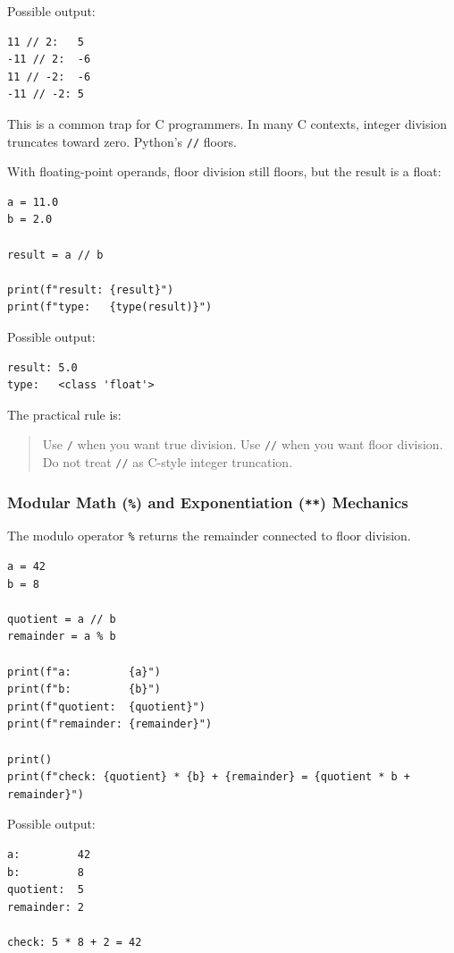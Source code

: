 Possible output:

\begin{verbatim}
11 // 2:   5
-11 // 2:  -6
11 // -2:  -6
-11 // -2: 5
\end{verbatim}

This is a common trap for C programmers. In many C contexts, integer division truncates toward zero. Python's \texttt{//} floors.

With floating-point operands, floor division still floors, but the result is a float:

\begin{verbatim}
a = 11.0
b = 2.0

result = a // b

print(f"result: {result}")
print(f"type:   {type(result)}")
\end{verbatim}

Possible output:

\begin{verbatim}
result: 5.0
type:   <class 'float'>
\end{verbatim}

The practical rule is:

\begin{quote}
Use \texttt{/} when you want true division. Use \texttt{//} when you want floor division. Do not treat \texttt{//} as C-style integer truncation.
\end{quote}

\subsubsection{Modular Math (\texttt{\%}) and Exponentiation (\texttt{**}) Mechanics}

The modulo operator \texttt{\%} returns the remainder connected to floor division.

\begin{verbatim}
a = 42
b = 8

quotient = a // b
remainder = a % b

print(f"a:         {a}")
print(f"b:         {b}")
print(f"quotient:  {quotient}")
print(f"remainder: {remainder}")

print()
print(f"check: {quotient} * {b} + {remainder} = {quotient * b + remainder}")
\end{verbatim}

Possible output:

\begin{verbatim}
a:         42
b:         8
quotient:  5
remainder: 2

check: 5 * 8 + 2 = 42
\end{verbatim}

